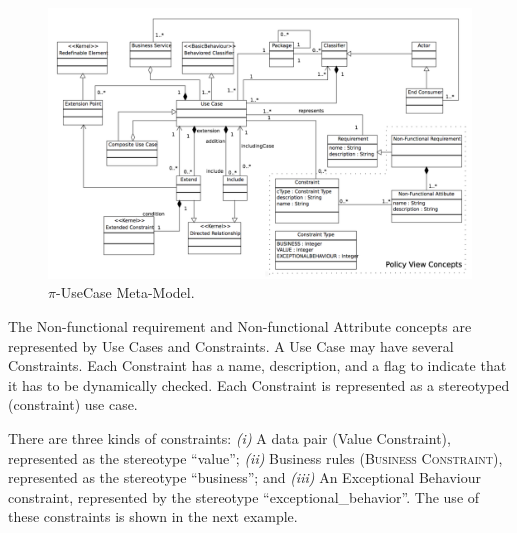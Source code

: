 \documentclass{singlecol-new}
\theoremstyle{TH}{
\newtheorem{lemma}{Lemma}
\newtheorem{theorem}[lemma]{Theorem}
\newtheorem{corrolary}[lemma]{Corrolary}
\newtheorem{conjecture}[lemma]{Conjecture}
\newtheorem{proposition}[lemma]{Proposition}
\newtheorem{claim}[lemma]{Claim}
\newtheorem{stheorem}[lemma]{Wrong Theorem}
\newtheorem{algorithm}{Algorithm}
}
\theoremstyle{THrm}{
\newtheorem{definition}{Definition}[section]
\newtheorem{question}{Question}[section]
\newtheorem{remark}{Remark}
\newtheorem{scheme}{Scheme}
}
\theoremstyle{THhit}{
\newtheorem{case}{Case}[section]
}
\theoremstyle{THhsl}{
\newtheorem{example}{Example}
}
\begin{document}
 \begin{figure}[h]
\center
\includegraphics[width=1\textwidth]{./figures/UseCaseMetaModel.pdf}
\caption{\label{fig:CIM:usecasemetamodel} $\pi$-{UseCase Meta-Model}.}
\end{figure}

 The {\sc Non-functional requirement} and {\sc Non-functional Attribute} concepts are represented by {\sc Use Cases} and {\sc Constraints}.
A {\sc Use Case} may have several {\sc Constraints}. Each {\sc Constraint} has a name, description, and a flag to indicate that it has to be  dynamically checked.
Each {\sc Con\-straint} is represented as a stereotyped ({\sf constraint})\footnotemark {} use case.

{There are three kinds of constraints:}
\textit{(i)} A data pair ({\sc Value Constraint}), represented as the stereotype ``value'';
\textit{(ii)} Business rules (\textsc{Business Constraint}), represented as the stereotype {\sf ``business''}; and
\textit{(iii)} An {\sc Exceptional Behaviour} constraint, represented by the stereotype {\sf ``exceptional\_behavior''}.
The use of these constraints is shown in the next example.
\end{document}

